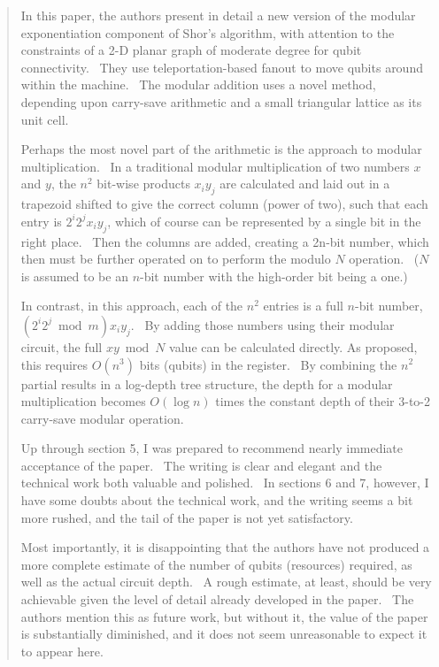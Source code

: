 \documentclass{article}
\theoremstyle{plain} \newtheorem{lemma}{Lemma}
\begin{document}
\begin{quote}
In this paper, the authors present in detail a new version of the
modular exponentiation component of Shor's algorithm, with attention
to the constraints of a 2-D planar graph of moderate degree for qubit
connectivity.  They use teleportation-based fanout to move qubits
around within the machine.  The modular addition uses a novel method,
depending upon carry-save arithmetic and a small triangular lattice as
its unit cell.

Perhaps the most novel part of the arithmetic is the approach to
modular multiplication.  In a traditional modular multiplication of
two numbers $x$ and $y$, the $n^2$ bit-wise products $x_i y_j$ are calculated
and laid out in a trapezoid shifted to give the correct column (power
of two), such that each entry is $2^i 2^j x_i y_j$, which of course can
be represented by a single bit in the right place.  Then the columns
are added, creating a 2n-bit number, which then must be further
operated on to perform the modulo $N$ operation.  ($N$ is assumed to be an
$n$-bit number with the high-order bit being a one.)

In contrast, in this approach, each of the $n^2$ entries is a full $n$-bit
number, $(2^i 2^j \bmod m) x_i y_j$.  By adding those numbers using their
modular circuit, the full $x y \bmod N$ value can be calculated directly.
As proposed, this requires $O(n^3)$ bits (qubits) in the register.  By
combining the $n^2$ partial results in a log-depth tree structure, the
depth for a modular multiplication becomes $O(\log n)$ times the constant
depth of their 3-to-2 carry-save modular operation.

Up through section 5, I was prepared to recommend nearly immediate
acceptance of the paper.  The writing is clear and elegant and the
technical work both valuable and polished.  In sections 6 and 7,
however, I have some doubts about the technical work, and the writing
seems a bit more rushed, and the tail of the paper is not yet
satisfactory.

Most importantly, it is disappointing that the authors have not
produced a more complete estimate of the number of qubits (resources)
required, as well as the actual circuit depth.  A rough estimate, at
least, should be very achievable given the level of detail already
developed in the paper.  The authors mention this as future work, but
without it, the value of the paper is substantially diminished, and it
does not seem unreasonable to expect it to appear here.

\end{quote}
\end{document}
